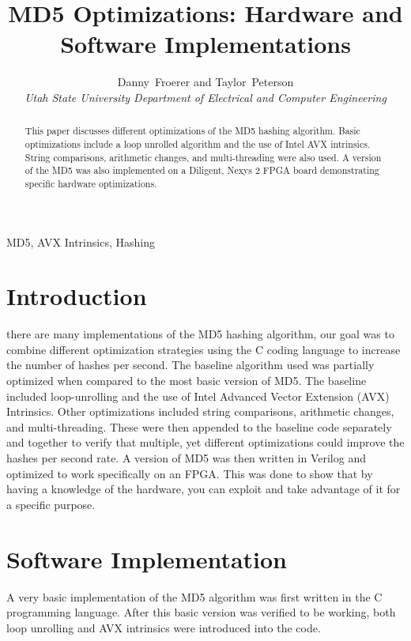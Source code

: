 \documentclass[journal]{IEEEtran}
\begin{document}
\title{MD5 Optimizations: Hardware and Software Implementations}

\author{Danny~Froerer and Taylor~Peterson\\
\textit{Utah State University Department of Electrical and Computer Engineering}}
\maketitle

\begin{abstract}
This paper discusses different optimizations of the MD5 hashing algorithm. Basic optimizations include a loop unrolled algorithm and the use of Intel AVX intrinsics. String comparisons, arithmetic changes, and multi-threading were also used. A version of the MD5 was also implemented on a Diligent, Nexys 2 FPGA board demonstrating specific hardware optimizations.  
\end{abstract}

\begin{IEEEkeywords}
MD5, AVX Intrinsics, Hashing 
\end{IEEEkeywords}


\section{Introduction}
 there are many implementations of the MD5 hashing algorithm, our goal was to combine different optimization strategies using the C coding language to increase the number of hashes per second. The baseline algorithm used was partially optimized when compared to the most basic version of MD5. The baseline included loop-unrolling and the use of Intel Advanced Vector Extension (AVX) Intrinsics. Other optimizations included string comparisons, arithmetic changes, and multi-threading. These were then appended to the baseline code separately and together to verify that multiple, yet different optimizations could improve the hashes per second rate. A version of MD5 was then written in Verilog and optimized to work specifically on an FPGA. This was done to show that by having a knowledge of the hardware, you can exploit and take advantage of it for a specific purpose.

\section{Software Implementation}
A very basic implementation of the MD5 algorithm was first written in the C programming language. After this basic version was verified to be working, both loop unrolling and AVX intrinsics were introduced into the code.
\end{document}

